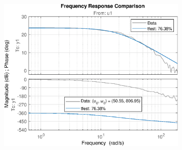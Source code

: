 \begin{figure}[H]
\begin{minipage}{0.32\textwidth}
\begin{figure}[H]
       \end{figure}
    \end{minipage}
    \begin{minipage}{0.32\textwidth}
       \begin{figure}[H]
            \includegraphics[width = \textwidth]{./figs/small_perturbation/freq_Compare_1650.eps}
       \end{figure}
    \end{minipage}
\end{figure}
